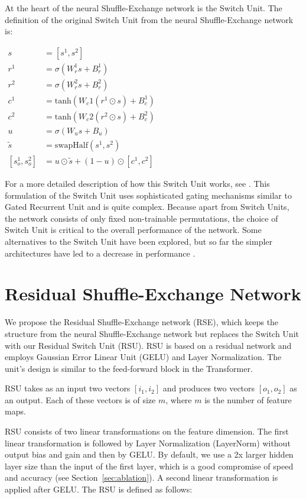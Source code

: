 \documentclass[letterpaper]{article} %
\begin{document}
At the heart of the neural Shuffle-Exchange network is the Switch Unit. The definition of the original Switch Unit from the neural Shuffle-Exchange network is:

\centerline{$\begin{aligned}
  s &= [s^1, s^2]\\
  r^1 &= \sigma(W_r^1s + B_r^1)\\
  r^2 &= \sigma(W_r^2s + B_r^2)\\
  c^1 &= \text{tanh}(W_c1(r^1 \odot s) + B_c^1)\\
  c^2 &= \text{tanh}(W_c2(r^2 \odot s) + B_c^2)\\
  u &= \sigma(W_us + B_u)\\
  \tilde{s} &= \text{swapHalf}(s^1, s^2)\\
  [s_o^1, s_o^2] &= u \odot \tilde{s} + (1 - u) \odot [c^1, c^2]
\end{aligned}$}

For a more detailed description of how this Switch Unit works, see \citet{shuffle-exchange}. This formulation of the Switch Unit uses sophisticated gating mechanisms similar to Gated Recurrent Unit \citep{cho2014learning} and is quite complex. Because apart from Switch Units, the network consists of only fixed non-trainable permutations, the choice of Switch Unit is critical to the overall performance of the network. Some alternatives to the Switch Unit have been explored, but so far the simpler architectures have led to a decrease in performance \citep{shuffle-exchange}.

\section{Residual Shuffle-Exchange Network}
\label{sec:model}

We propose the Residual Shuffle-Exchange network (RSE), which keeps the structure from the neural Shuffle-Exchange network but replaces the Switch Unit with our Residual Switch Unit (RSU). RSU is based on a residual network and employs Gaussian Error Linear Unit (GELU) \cite{hendrycks2016gaussian} and Layer Normalization. The unit's design is similar to the feed-forward block in the Transformer.

RSU takes as an input two vectors $[i_1, i_2]$ and produces two vectors $[o_1, o_2]$ as an output. Each of these vectors is of size $m$, where $m$ is the number of feature maps.

RSU consists of two linear transformations on the feature dimension. The first linear transformation is followed by Layer Normalization (LayerNorm) without output bias and gain \cite{xu2019understanding} and then by GELU. By default, we use a 2x larger hidden layer size than the input of the first layer, which is a good compromise of speed and accuracy (see Section~\ref{sec:ablation}). A second linear transformation is applied after GELU.
The RSU is defined as follows:
\end{document}
